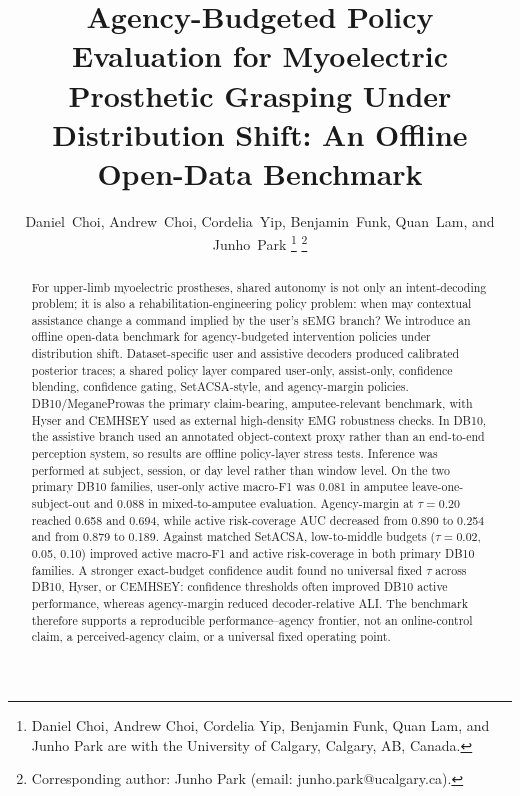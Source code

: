 \documentclass[journal]{IEEEtran}
\newcommand{\dbten}{DB10/MeganePro}
\begin{document}
\title{Agency-Budgeted Policy Evaluation for Myoelectric Prosthetic Grasping Under Distribution Shift: An Offline Open-Data Benchmark}

\author{Daniel~Choi, Andrew~Choi, Cordelia~Yip, Benjamin~Funk, Quan~Lam, and Junho~Park%
\thanks{Daniel Choi, Andrew Choi, Cordelia Yip, Benjamin Funk, Quan Lam, and Junho Park are with the University of Calgary, Calgary, AB, Canada.}
\thanks{Corresponding author: Junho Park (email: junho.park@ucalgary.ca).}}


\maketitle

\begin{abstract}
For upper-limb myoelectric prostheses, shared autonomy is not only an intent-decoding problem; it is also a rehabilitation-engineering policy problem: when may contextual assistance change a command implied by the user's sEMG branch? We introduce an offline open-data benchmark for agency-budgeted intervention policies under distribution shift. Dataset-specific user and assistive decoders produced calibrated posterior traces; a shared policy layer compared user-only, assist-only, confidence blending, confidence gating, SetACSA-style, and agency-margin policies. \dbten was the primary claim-bearing, amputee-relevant benchmark, with Hyser and CEMHSEY used as external high-density EMG robustness checks. In DB10, the assistive branch used an annotated object-context proxy rather than an end-to-end perception system, so results are offline policy-layer stress tests. Inference was performed at subject, session, or day level rather than window level. On the two primary DB10 families, user-only active macro-F1 was 0.081 in amputee leave-one-subject-out and 0.088 in mixed-to-amputee evaluation. Agency-margin at $\tau=0.20$ reached 0.658 and 0.694, while active risk-coverage AUC decreased from 0.890 to 0.254 and from 0.879 to 0.189. Against matched SetACSA, low-to-middle budgets ($\tau=0.02$, 0.05, 0.10) improved active macro-F1 and active risk-coverage in both primary DB10 families. A stronger exact-budget confidence audit found no universal fixed $\tau$ across DB10, Hyser, or CEMHSEY: confidence thresholds often improved DB10 active performance, whereas agency-margin reduced decoder-relative ALI. The benchmark therefore supports a reproducible performance--agency frontier, not an online-control claim, a perceived-agency claim, or a universal fixed operating point.
\end{abstract}
\end{document}
